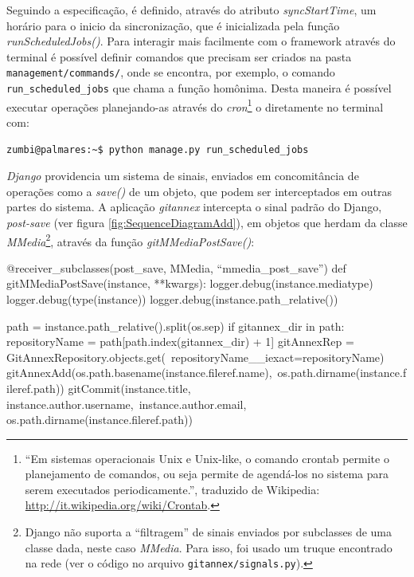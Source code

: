 Seguindo a especificação, é definido, através do atributo
\emph{syncStartTime}, um horário para o inicio da sincronização, que é
inicializada pela função \emph{runScheduledJobs()}. Para interagir
mais facilmente com o framework através do terminal é possível definir
comandos que precisam ser criados na pasta
\verb|management/commands/|, onde se encontra, por exemplo, o comando
\verb|run_scheduled_jobs| que chama a função homônima. Desta maneira
é possível executar operações planejando-as através do
\emph{cron}\footnote{``Em sistemas operacionais Unix e Unix-like, o
  comando crontab permite o planejamento de comandos, ou seja permite
  de agendá-los no sistema para serem executados periodicamente.'',
  traduzido de Wikipedia:
  \url{http://it.wikipedia.org/wiki/Crontab}.} o diretamente no
terminal com:
\begin{verbatim}
zumbi@palmares:~$ python manage.py run_scheduled_jobs
\end{verbatim}

\emph{Django} providencia um sistema de sinais, enviados em
concomitância de operações como a \emph{save()} de um objeto, que
podem ser interceptados em outras partes do sistema. A aplicação
\emph{gitannex} intercepta o sinal padrão do Django, \emph{post-save}
(ver figura \ref{fig:SequenceDiagramAdd}), em objetos que herdam da
classe \emph{MMedia}\footnote{Django não suporta a ``filtragem'' de
  sinais enviados por subclasses de uma classe dada, neste caso
  \emph{MMedia}. Para isso, foi usado um truque encontrado na rede
  (ver o código no arquivo \texttt{gitannex/signals.py}).}, através da
função \emph{gitMMediaPostSave()}:

\begin{code}
@receiver_subclasses(post_save, MMedia, ``mmedia_post_save'')
def gitMMediaPostSave(instance, **kwargs):
    logger.debug(instance.mediatype)
    logger.debug(type(instance))
    logger.debug(instance.path_relative())

    path = instance.path_relative().split(os.sep)
    if gitannex_dir in path:
        repositoryName = path[path.index(gitannex_dir) + 1]
        gitAnnexRep = GitAnnexRepository.objects.get(\
                      repositoryName__iexact=repositoryName)
        gitAnnexAdd(os.path.basename(instance.fileref.name),\
                    os.path.dirname(instance.fileref.path))
        gitCommit(instance.title, instance.author.username,\
                  instance.author.email, os.path.dirname(instance.fileref.path))
\end{code}

